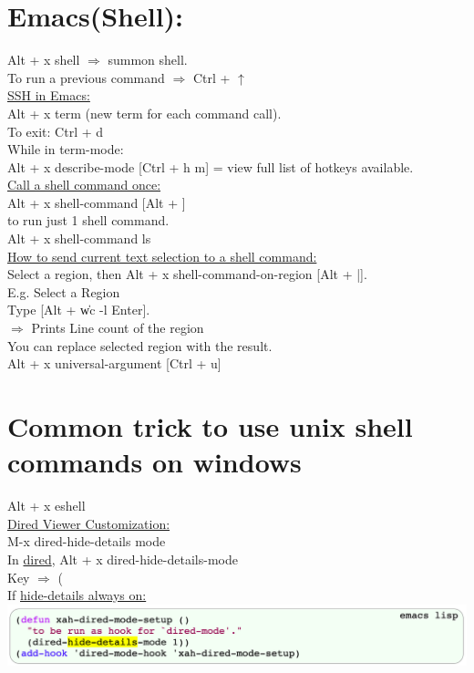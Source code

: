 \documentclass{article}
\begin{document}
\section{Emacs(Shell):}
Alt + x shell $\Rightarrow$ summon shell.
\\
To run a previous command $\Rightarrow$ Ctrl + $\uparrow$
\\
\underline{SSH in Emacs:}
\\
Alt + x term (new term for each command call).
\\
To exit: Ctrl + d
\\
While in term-mode:
\\
Alt + x describe-mode [Ctrl + h m] = view full list of hotkeys available.
\\
\underline{Call a shell command once:}
\\
Alt + x shell-command [Alt + \!]
\\
to run just 1 shell command.
\\
Alt + x shell-command ls
\\
\underline{How to send current text selection to a shell command:}
\\
Select a region, then Alt + x shell-command-on-region [Alt + |].
\\
E.g. Select a Region
\\
Type [Alt + \| wc -l Enter].
\\
$\Rightarrow$ Prints Line count of the region
\\
You can replace selected region with the result.
\\
Alt + x universal-argument [Ctrl + u]
\\
\section{Common trick to use unix shell commands on windows}
Alt + x eshell
\\
\underline{Dired Viewer Customization:}
\\
M-x dired-hide-details mode
\\
In \underline{dired}, Alt + x dired-hide-details-mode
\\
Key $\Rightarrow$ (
\\
If \underline{hide-details always on:}
\\

\includegraphics[width=\linewidth]{hide-details.png}
\end{document}

